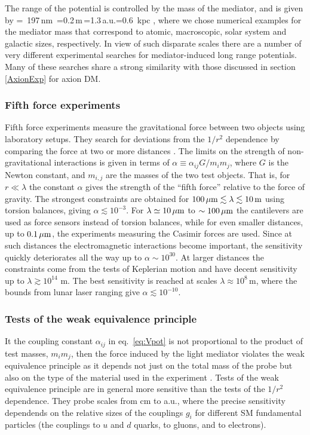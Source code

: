 The range of the potential is controlled by the mass of the mediator, and is given by
\beq
\lambda \equiv {}=\, 197\,{\rm nm}\, =0.2\,{\rm m}\,=1.3\,{\rm a.u.}=0.6\, {\rm kpc} ,
\eeq
where we chose numerical examples for the mediator mass that correspond to atomic, macroscopic, solar system and galactic sizes, respectively. 
In view of such disparate scales there are a number of very different experimental searches for mediator-induced long range potentials. 
Many of these searches share a strong similarity with those discussed in section \ref{AxionExp} for axion DM. 


\subsubsection{Fifth force experiments} 
Fifth force experiments measure the gravitational force between two objects using laboratory setups. They search for deviations from the $1/r^2$ dependence by comparing the force at two or more distances \cite{fifth:force:reviews}. The limits on the strength of non-gravitational interactions is given in terms of $\alpha\equiv \alpha_{ij}  G/m_i m_j$, where $G$ is the Newton constant, and $m_{i,j}$ are the masses of the two test objects. That is, for $r\ll \lambda$ the constant $\alpha$ gives the strength of the ``fifth force'' relative to the force of gravity. The strongest constraints are obtained for $100\,{\rm \mu m }\lesssim \lambda \lesssim 10\,{\rm m}$ using torsion balances, giving $\alpha \lesssim 10^{-3}$. For $\lambda\simeq 10 \,{\rm \mu m }$ to $\sim 100\,{\rm \mu m}$  the cantilevers are used as force sensors instead of torsion balances, while for even smaller distances, up to $0.1\,{\rm \mu m}$, the experiments measuring the Casimir forces are used. Since at such distances the electromagnetic interactions become important, the sensitivity quickly deteriorates all the way up to $\alpha \sim 10^{30}$. At larger distances the constraints come from the tests of Keplerian motion and have decent sensitivity up to $\lambda\gtrsim 10^{14}$ m. The  best sensitivity is reached at scales $\lambda\approx 10^{8}$\,m, where the bounds from lunar laser ranging give $\alpha \lesssim 10^{-10}$. 

\subsubsection{Tests of the weak equivalence principle}
It the coupling constant $\alpha_{ij}$ in eq.~\eqref{eq:Vpot} is not proportional to the product of test masses, $m_i m_j$, then the force induced by the light mediator violates the weak equivalence principle as it depends not just on the total mass of the probe but also on the type of the material used in the  experiment \cite{fifth:force:reviews}. 
Tests of the weak equivalence principle are in general more sensitive than the tests of the $1/r^2$ dependence. They probe scales from cm to a.u., where the precise sensitivity dependends on the relative sizes of the couplings $g_i$ for different SM fundamental particles (the couplings to $u$ and $d$ quarks, to gluons, and to electrons).


